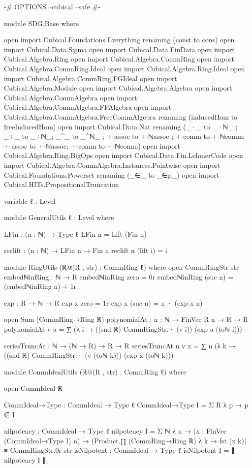 {-# OPTIONS --cubical --safe #-}

module SDG.Base where

  open import Cubical.Foundations.Everything renaming (const to cons)
  open import Cubical.Data.Sigma
  open import Cubical.Data.FinData
  open import Cubical.Algebra.Ring
  open import Cubical.Algebra.CommRing
  open import Cubical.Algebra.CommRing.Ideal
  open import Cubical.Algebra.Ring.Ideal
  open import Cubical.Algebra.CommRing.FGIdeal  
  open import Cubical.Algebra.Module  
  open import Cubical.Algebra.Algebra
  open import Cubical.Algebra.CommAlgebra
  open import Cubical.Algebra.CommAlgebra.FPAlgebra
  open import Cubical.Algebra.CommAlgebra.FreeCommAlgebra 
    renaming (inducedHom to freeInducedHom)
  open import Cubical.Data.Nat renaming (_·_ to _·ℕ_ ; _+_ to _+ℕ_; _^_ to _^ℕ_ ; +-assoc to +-ℕassoc ; +-comm to +-ℕcomm; ·-assoc to ·-ℕassoc; ·-comm to ·-ℕcomm)
  open import Cubical.Algebra.Ring.BigOps
  open import Cubical.Data.Fin.LehmerCode
  open import Cubical.Algebra.CommAlgebra.Instances.Pointwise
  open import Cubical.Foundations.Powerset renaming (_∈_ to _∈p_)
  open import Cubical.HITs.PropositionalTruncation

  variable
    ℓ : Level

  module GeneralUtils {ℓ : Level} where
    
    LFin : (n : ℕ) → Type ℓ
    LFin n = Lift (Fin n)

    reclift : (n : ℕ) → LFin n → Fin n
    reclift n (lift i) = i

  module RingUtils (ℝ@(R , str) : CommRing ℓ) where
    open CommRingStr str
    embedℕinRing : ℕ → R
    embedℕinRing zero = 0r
    embedℕinRing (suc n) = (embedℕinRing n) + 1r

    exp : R → ℕ → R
    exp x zero = 1r
    exp x (suc n) = x · (exp x n)

    open Sum (CommRing→Ring ℝ)
    polynomialAt : {n : ℕ} → FinVec R n → R → R
    polynomialAt v a = ∑ (λ i → ((snd ℝ) CommRingStr.· (v i)) (exp a (toℕ i)))

    seriesTruncAt : ℕ → (ℕ → R) → R → R
    seriesTruncAt n v x = ∑ {n} (λ k → ((snd ℝ) CommRingStr.· (v (toℕ k))) (exp x (toℕ k)))

  module CommIdealUtils (ℝ@(R , str) : CommRing ℓ) where

    open CommIdeal ℝ

    CommIdeal→Type : CommIdeal → Type ℓ
    CommIdeal→Type I = Σ R λ p → p ∈ I
    
    nilpotency : CommIdeal → Type ℓ
    nilpotency I = Σ ℕ λ n → (x : FinVec (CommIdeal→Type I) n) → (Product.∏ (CommRing→Ring ℝ) λ k → fst (x k)) ≡ CommRingStr.0r str 
    isNilpotent : CommIdeal → Type ℓ
    isNilpotent I = ∥ nilpotency I ∥₁

